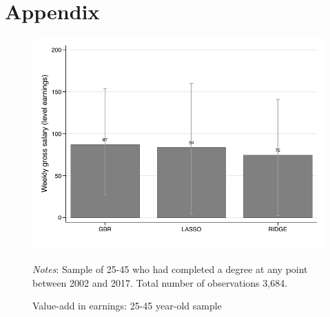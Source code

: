 \documentclass[12pt, a4paper]{article}
\begin{document}


\clearpage




\clearpage
\section{Appendix}
%
%

\begin{figure}[htbp]
\centering
\caption{Value-add in earnings: 25-45 year-old sample}
\vspace{0.5cm}
  \label{fig:valadle46}
    \includegraphics{_figures/valad_levearn_46.pdf}
\parbox{1\textwidth}{\footnotesize{\textit{Notes}: Sample of 25-45 who had completed a degree at any point between 2002 and 2017. Total number of observations 3,684.}}
\end{figure}
\end{document}
